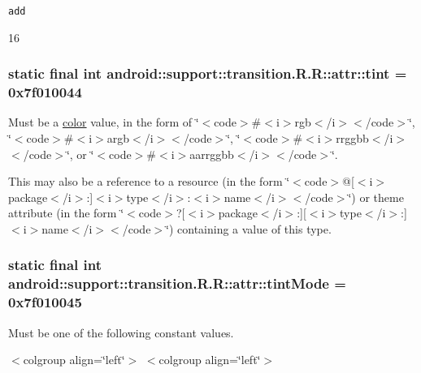 {\tt add}

16\hypertarget{classandroid_1_1support_1_1transition_1_1_r_1_1attr_e7233a7ea0205c8a7b30f39595004a79}{
\subsubsection[{tint}]{\setlength{\rightskip}{0pt plus 5cm}static final int android::support::transition.R.R::attr::tint = 0x7f010044}}
\label{classandroid_1_1support_1_1transition_1_1_r_1_1attr_e7233a7ea0205c8a7b30f39595004a79}


Must be a \hyperlink{classandroid_1_1support_1_1transition_1_1_r_1_1color}{color} value, in the form of \char`\"{}$<$code$>$\#$<$i$>$rgb$<$/i$>$$<$/code$>$\char`\"{}, \char`\"{}$<$code$>$\#$<$i$>$argb$<$/i$>$$<$/code$>$\char`\"{}, \char`\"{}$<$code$>$\#$<$i$>$rrggbb$<$/i$>$$<$/code$>$\char`\"{}, or \char`\"{}$<$code$>$\#$<$i$>$aarrggbb$<$/i$>$$<$/code$>$\char`\"{}. 

This may also be a reference to a resource (in the form \char`\"{}$<$code$>$@\mbox{[}$<$i$>$package$<$/i$>$:\mbox{]}$<$i$>$type$<$/i$>$:$<$i$>$name$<$/i$>$$<$/code$>$\char`\"{}) or theme attribute (in the form \char`\"{}$<$code$>$?\mbox{[}$<$i$>$package$<$/i$>$:\mbox{]}\mbox{[}$<$i$>$type$<$/i$>$:\mbox{]}$<$i$>$name$<$/i$>$$<$/code$>$\char`\"{}) containing a value of this type. \hypertarget{classandroid_1_1support_1_1transition_1_1_r_1_1attr_752c4b30698a54e0781043e044b674c4}{
\subsubsection[{tintMode}]{\setlength{\rightskip}{0pt plus 5cm}static final int android::support::transition.R.R::attr::tintMode = 0x7f010045}}
\label{classandroid_1_1support_1_1transition_1_1_r_1_1attr_752c4b30698a54e0781043e044b674c4}


Must be one of the following constant values. \begin{TabularC}{0}
\hline
\end{TabularC}
$<$colgroup align=\char`\"{}left\char`\"{}$>$ $<$colgroup align=\char`\"{}left\char`\"{}$>$ 

